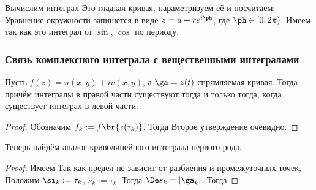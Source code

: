 \documentclass[a4paper]{article}
\begin{document}
\begin{solution}
\begin{ex}
Вычислим интеграл
Это гладкая кривая, параметризуем её и посчитаем: Уравнение окружности запишется в виде
$z = a + re^{i\ph}$, где $\ph \in [0, 2\pi)$. Имеем
так как это интеграл от $\sin$, $\cos$ по периоду.
\end{ex}

\subsubsection{Связь комплексного интеграла с вещественными интегралами}

\begin{stm}
Пусть $f(z) = u(x,y) + i v(x,y)$, а $\ga = z(t)$ спрямляемая кривая.
Тогда
причём интегралы в правой части существуют тогда и только тогда, когда существует интеграл в левой части.
\end{stm}
\begin{proof}
Обозначим $f_k := f\br{z(\tau_k)}$. Тогда
Второе утверждение очевидно.
\end{proof}

Теперь найдём аналог криволинейного интеграла первого рода.

\begin{df}
\end{df}

\begin{stm}
\end{stm}
\begin{proof}
Имеем
Так как предел не зависит от разбиения и промежуточных точек, Положим $\si_k := \tau_k$, $s_k := \tau_k$.
Тогда $\De s_k = |\ga_k|$.
Тогда
\hfill\end{proof}


\end{solution}
\end{document}
